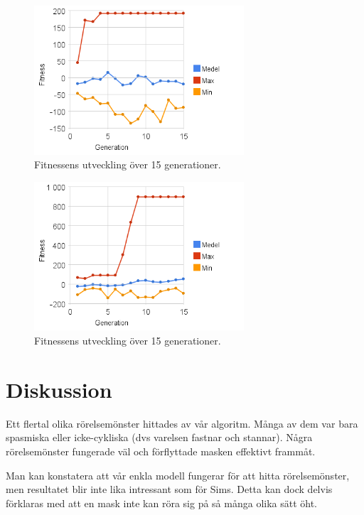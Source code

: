 \documentclass[titlepage, twocolumn, a4paper, 12pt, swedish]{article}
\begin{document}
\begin{figure}
    \includegraphics[width=78mm]{images/diagram3.png}
    \caption{Fitnessens utveckling över 15 generationer.}
    \label{fig:d2}
\end{figure}

\begin{figure}
    \includegraphics[width=78mm]{images/diagram_m01c08_2.png}
    \caption{Fitnessens utveckling över 15 generationer.}
    \label{fig:d3}
\end{figure}

\section{Diskussion}
Ett flertal olika rörelsemönster hittades av vår algoritm. Många av dem var bara spasmiska eller icke-cykliska (dvs varelsen fastnar och stannar). Några rörelsemönster fungerade väl och förflyttade masken effektivt frammåt. 

Man kan konstatera att vår enkla modell fungerar för att hitta rörelsemönster, men resultatet blir inte lika intressant som för Sims. Detta kan dock delvis förklaras med att en mask inte kan röra sig på så många olika sätt öht.
\end{document}
